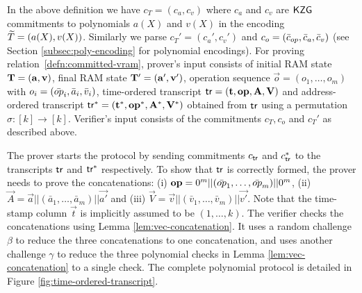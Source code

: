 \noindent In the above definition we have $c_T=(c_a,c_v)$ where $c_a$ and $c_v$ are $\mathsf{KZG}$ commitments to polynomials $a(X)$ and $v(X)$ in
the encoding $\widetilde{T}=(a(X), v(X))$. Similarly we parse $c_T'=(c_a', c_v')$ and $c_o=(\bar{c}_{op}, \bar{c}_a, \bar{c}_v)$ (see Section
\ref{subsec:poly-encoding} for polynomial encodings).
For proving relation~\ref{defn:committed-vram}, prover's input consists of initial RAM state $\mathbf{T}=(\mathbf{a},\mathbf{v})$,
final RAM state $\mathbf{T}'=(\mathbf{a'},\mathbf{v'})$, operation sequence $\vec{o}=(o_1,\ldots,o_m)$ with $o_i=(\bar{{op}}_i,\bar{a}_i,\bar{v}_i)$,
time-ordered transcript $\mathsf{tr}=(\mathbf{t},\mathbf{{op}},\mathbf{A},\mathbf{V})$ and address-ordered transcript $\mathsf{tr}^\ast=(\mathbf{t^\ast},\mathbf{{op}^\ast},
\mathbf{A^\ast},\mathbf{V^\ast})$ obtained from $\mathsf{tr}$ using a permutation $\sigma:[k]\rightarrow [k]$.
Verifier's input consists of the commitments $c_T, c_o$ and $c_T'$ as described above.

The prover starts the protocol by sending commitments $c_{\mathsf{tr}}$ and $c^\ast_{\mathsf{tr}}$ to the transcripts $\mathsf{tr}$ and $\mathsf{tr}^\ast$ respectively.
To show that $\mathsf{tr}$ is correctly formed, the prover needs to prove the concatenations:
(i) $\mathbf{{op}}=0^m||(\bar{{op}}_1,\ldots,\bar{{op}}_m)||0^m$, (ii) $\vec{A}=\vec{a}||(\bar{a}_1,\ldots,\bar{a}_m)||\vec{a'}$
and (iii) $\vec{V}=\vec{v}||(\bar{v}_1,\ldots,\bar{v}_m)||\vec{v'}$. Note that the time-stamp column $\vec{t}$ is implicitly assumed
to be $(1,\ldots,k)$.
The verifier checks the concatenations using Lemma \ref{lem:vec-concatenation}.
It uses a random challenge $\beta$ to reduce the three concatenations to one concatenation, and uses another challenge $\gamma$
to reduce the three polynomial checks in Lemma \ref{lem:vec-concatenation} to a single check.
The complete polynomial protocol is detailed in Figure \ref{fig:time-ordered-transcript}.


